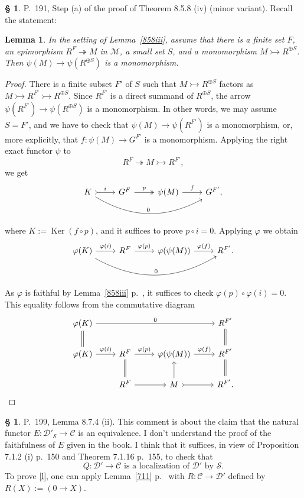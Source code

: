\documentclass[12pt]{article}
\newtheorem{lem}[thm]{Lemma}
\theoremstyle{remark}
\theoremstyle{definition}
\newtheorem{s}[thm]{\S}
\newcommand{\cc}{\mathcal}
\newcommand{\C}{\mathcal C}
\newcommand{\M}{\mathcal M}
\newcommand{\mv}{ (minor variant)}
\newcommand{\epi}{\twoheadrightarrow}
\DeclareMathOperator{\Ker}{Ker}
\begin{document}
%
%
\begin{s} 
P.~191, Step (a) of the proof of Theorem 8.5.8 (iv)\mv. Recall the statement: 
%
\begin{lem}
%
In the setting of Lemma~\ref{858iii}, assume that there is a finite set $F$, an epimorphism $R^F\epi M$ in $\M$, a small set $S$, and a monomorphism $M\rightarrowtail R^{\oplus S}$. Then $\psi(M)\to\psi(R^{\oplus S})$ is a monomorphism. 
%
\end{lem}
%
\begin{proof}
There is a finite subset $F'$ of $S$ such that $M\rightarrowtail R^{\oplus S}$ factors as $M\rightarrowtail R^{F'}\rightarrowtail R^{\oplus S}$. Since $R^{F'}$ is a direct summand of $R^{\oplus S}$, the arrow $\psi(R^{F'})\to\psi(R^{\oplus S})$ is a monomorphism. In other words, we may assume $S=F'$, and we have to check that $\psi(M)\to\psi(R^{F'})$ is a monomorphism, or, more explicitly, that $f:\psi(M)\to G^{F'}$ is a monomorphism. Applying the right exact functor $\psi$ to 
$$
R^F\epi M\rightarrowtail R^{F'},
$$
we get 
$$
\begin{tikzcd}
K\ar[tail]{r}{i}\ar[bend right]{rrr}{0}&G^F\ar[two heads]{r}{p}&\psi(M)\ar{r}{f}&G^{F'},
\end{tikzcd}
$$
where $K:=\Ker(f\circ p)$, and it suffices to prove $p\circ i=0$. Applying $\varphi$ we obtain
$$
\begin{tikzcd}
\varphi(K)\ar{r}{\varphi(i)}\ar[bend right]{rrr}{0}&R^F\ar{r}{\varphi(p)}&\varphi(\psi(M))\ar{r}{\varphi(f)}&R^{F'}.
\end{tikzcd}
$$
As $\varphi$ is faithful by Lemma~\ref{858iii} p.~\pageref{858iii}, it suffices to check $\varphi(p)\circ\varphi(i)=0$. This equality follows from the commutative diagram
$$
\begin{tikzcd}
\varphi(K)\ar[equal]{d}\ar{rrr}{0}&&&R^{F'}\ar[equal]{d}\\
\varphi(K)\ar{r}{\varphi(i)}&R^F\ar[equal]{d}\ar{r}{\varphi(p)}&\varphi(\psi(M))\ar{r}{\varphi(f)}&R^{F'}\ar[equal]{d}\\
&R^F\ar{r}&M\ar[tail]{r}\ar{u}&R^{F'}.
\end{tikzcd}
$$
\end{proof}
\end{s}
%
%
\begin{s}
P.~199, Lemma 8.7.4 (ii). This comment is about the claim that the natural functor $E:\cc D'_{\cc S}\to\C$ is an equivalence. I don't understand the proof of the faithfulness of $E$ given in the book. I think that it suffices, in view of Proposition 7.1.2 (i) p.~150 and Theorem 7.1.16 p.~155, to check that
%
\begin{equation}\label{l}
Q:\cc D'\to\C\text{ is a localization of }\cc D'\text{ by }\cc S.
\end{equation}
%
To prove \eqref{l}, one can apply Lemma~\ref{711} p.~\pageref{711} with $R:\C\to\cc D'$ defined by $R(X):=(0\to X)$.
\end{s}
\end{document}
